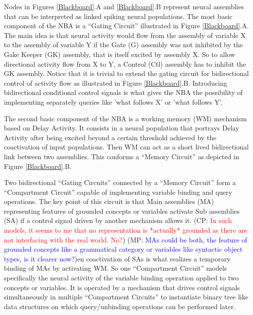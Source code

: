 \documentclass[10pt]{article}
\newcommand{\noteCP}[1]{(CP: \textcolor{red}{#1})}
\newcommand{\noteMP}[3]{(MP: \textcolor{blue}{#1})}
\begin{document}
Nodes in Figures {\ref{Blackboard}}.A and {\ref{Blackboard}}.B represent neural assemblies that can be interpreted as linked spiking neural populations.
The most basic component of the NBA is a ``Gating Circuit'' illustrated in Figure {\ref{Blackboard}}.A.
The main idea is that neural activity would flow from the assembly of variable X to the assembly of variable Y if the Gate (G) assembly was not inhibited by the Gake Keeper (GK) assembly, that is itself excited by assembly X.
So to allow directional activity flow from X to Y, a Control (Ctl) assembly has to inhibit the GK assembly.
Notice that it is trivial to extend the gating circuit for bidirectional control of activity flow as illustrated in Figure {\ref{Blackboard}}.B.
Introducing bidirectional conditional control signals is what gives the NBA the possibility of implementing separately queries like 'what follows X' or 'what follows Y'.

The second basic component of the NBA is a working memory (WM) mechanism based on Delay Activity\cite{de_Kamps_2005}.
It consists in a neural population that portrays Delay Activity after being excited beyond a certain threshold achieved by the coactivation of input populations.
Then WM can act as a short lived bidirectional link between two assemblies. This conforms a ``Memory Circuit'' as depicted in Figure {\ref{Blackboard}}.B.

Two bidirectional ``Gating Circuits'' connected by a ``Memory Circuit'' form a ``Compartment Circuit'' capable of implementing variable binding and query operations.
The key point of this circuit is that Main assemblies (MA) representing features of grounded concepts or variables activate Sub assemblies (SA) if a control signal driven by another mechanism allows it.
\noteCP{In such models, it seems to me that no representation is *actually* grounded as there are not interfacing with the real world. No?}
\noteMP{MAs could be both, the feature of grounded concepts like a grammatical category or variables like syntactic object types, is it clearer now?}
Then coactivation of SAs is what realizes a temporary binding of MAs by activating WM.
So one ``Compartment Circuit'' models specifically the neural activity of the variable binding operation applied to two concepts or variables.
It is operated by a mechanism that drives control signals simultaneously in multiple ``Compartment Circuits'' to instantiate binary tree like data structures on which query/unbinding operations can be performed later. 
\end{document}

